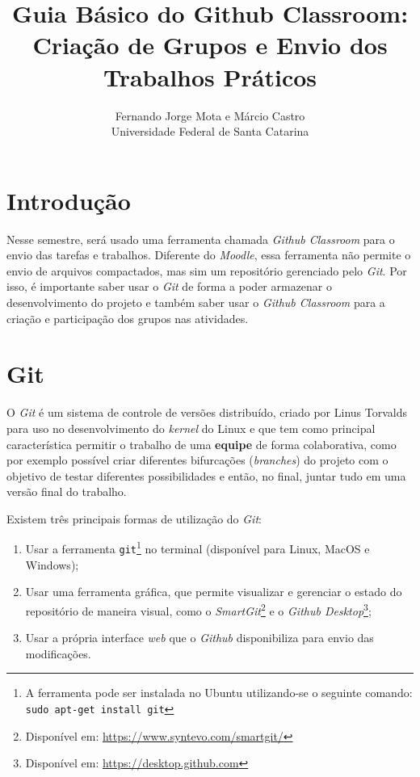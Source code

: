 \documentclass[11pt]{article}
\title{Guia Básico do Github Classroom:\\Criação de Grupos e Envio dos Trabalhos Práticos}
\author{Fernando Jorge Mota e Márcio Castro\\[0.3em]
\small Universidade Federal de Santa Catarina}
\date{}
\begin{document}
\maketitle

\section{Introdução}

Nesse semestre, será usado uma ferramenta chamada \textit{Github Classroom} para o envio das tarefas e trabalhos. Diferente do \textit{Moodle}, essa ferramenta não permite o envio de arquivos compactados, mas sim um repositório gerenciado pelo \textit{Git}. Por isso, é importante saber usar o \textit{Git} de forma a poder armazenar o desenvolvimento do projeto e também saber usar o \textit{Github Classroom} para a criação e participação dos grupos nas atividades.

\section{Git}

O \textit{Git} é um sistema de controle de versões distribuído, criado por Linus Torvalds para uso no desenvolvimento do \textit{kernel} do Linux e que tem como principal característica permitir o trabalho de uma \textbf{equipe} de forma colaborativa, como por exemplo possível criar diferentes bifurcações (\textit{branches}) do projeto com o objetivo de testar diferentes possibilidades e então, no final, juntar tudo em uma versão final do trabalho.

Existem três principais formas de utilização do \textit{Git}:

\begin{enumerate}
\item Usar a ferramenta \texttt{git}\footnote{A ferramenta pode ser instalada no Ubuntu utilizando-se o seguinte comando: \texttt{sudo apt-get install git}} no terminal (disponível para Linux, MacOS e Windows);
\item Usar uma ferramenta gráfica, que permite visualizar e gerenciar o estado do repositório de maneira visual, como o \textit{SmartGit}\footnote{Disponível em: \url{https://www.syntevo.com/smartgit/}} e o \textit{Github Desktop}\footnote{Disponível em: \url{https://desktop.github.com}};
\item Usar a própria interface \textit{web} que o \textit{Github} disponibiliza para envio das modificações.
\end{enumerate}
\end{document}
